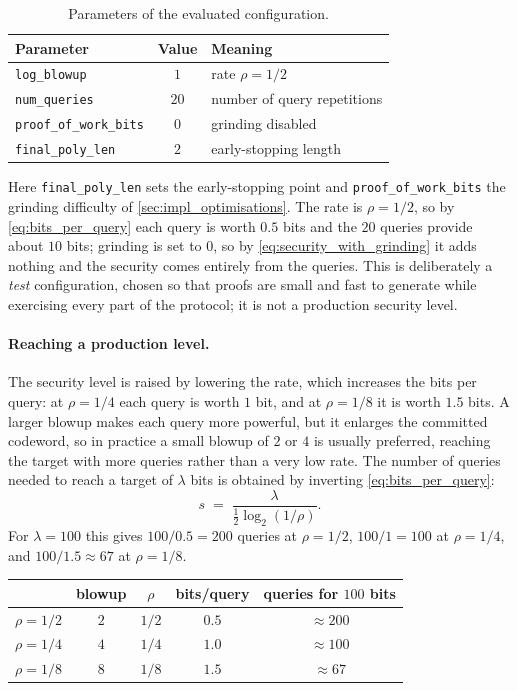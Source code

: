 \begin{table}[ht]
\centering
\begin{tabular}{lcl}
\hline
Parameter & Value & Meaning \\
\hline
\texttt{log\_blowup}         & $1$ & rate $\rho = 1/2$ \\
\texttt{num\_queries}        & $20$ & number of query repetitions \\
\texttt{proof\_of\_work\_bits} & $0$ & grinding disabled \\
\texttt{final\_poly\_len}     & $2$ & early-stopping length \\
\hline
\end{tabular}
\caption{Parameters of the evaluated configuration.}
\label{tab:params}
\end{table}


Here \texttt{final\_poly\_len} sets the early-stopping point and
\texttt{proof\_of\_work\_bits} the grinding difficulty of
\cref{sec:impl_optimisations}. The rate is $\rho = 1/2$, so by
\cref{eq:bits_per_query} each query is worth $0.5$ bits and the $20$
queries provide about $10$ bits; grinding is set to $0$, so by
\cref{eq:security_with_grinding} it adds nothing and the security comes entirely
from the queries. This is deliberately a \emph{test} configuration, chosen so that proofs are small and fast to generate while
exercising every part of the protocol; it is not a production security
level.

\paragraph{Reaching a production level.}
The security level is raised by lowering the rate, which increases the
bits per query: at $\rho = 1/4$ each query is worth $1$ bit, and at
$\rho = 1/8$ it is worth $1.5$ bits. A larger blowup makes each query
more powerful, but it enlarges the committed codeword, so in practice a
small blowup of $2$ or $4$ is usually preferred, reaching the target with
more queries rather than a very low rate. The number of queries needed to
reach a target of $\lambda$ bits is obtained by inverting
\cref{eq:bits_per_query}:
%
\begin{equation}
\label{eq:queries_for_target}
s \;=\; \frac{\lambda}{\tfrac{1}{2}\log_2(1/\rho)} .
\end{equation}
%
For $\lambda = 100$ this gives $100/0.5 = 200$ queries at $\rho = 1/2$,
$100/1 = 100$ at $\rho = 1/4$, and $100/1.5 \approx 67$ at $\rho = 1/8$.

\begin{center}
\begin{tabular}{lcccc}
\hline
 & blowup & $\rho$ & bits/query & queries for $100$ bits \\
\hline
$\rho = 1/2$ & $2$ & $1/2$ & $0.5$ & $\approx 200$ \\
$\rho = 1/4$ & $4$ & $1/4$ & $1.0$ & $\approx 100$ \\
$\rho = 1/8$ & $8$ & $1/8$ & $1.5$ & $\approx 67$ \\
\hline
\end{tabular}
\end{center}

